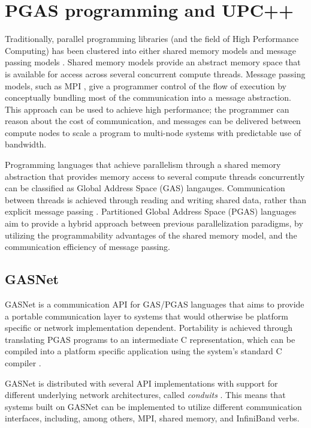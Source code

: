 \documentclass{uit-report}
\begin{document}
\chapter{PGAS programming and UPC++}
Traditionally, parallel programming libraries (and the field of High Performance Computing) has been clustered into either shared memory models and message passing models \cite{pgas_languages}. Shared memory models provide an abstract memory space that is available for access across several concurrent compute threads. Message passing models, such as MPI \cite{MPI}, give a programmer control of the flow of execution by conceptually bundling most of the communication into a message abstraction. This approach can be used to achieve high performance; the programmer can reason about the cost of communication, and messages can be delivered between compute nodes to scale a program to multi-node systems with predictable use of bandwidth.


Programming languages that achieve parallelism through a shared memory abstraction that provides memory access to several compute threads concurrently can be classified as Global Address Space (GAS) langauges. Communication between threads is achieved through reading and writing shared data, rather than explicit message passing \cite{gasnet_description}. Partitioned Global Address Space (PGAS) languages aim to provide a hybrid approach between previous parallelization paradigms, by utilizing the programmability advantages of the shared memory model, and the communication efficiency of message passing.

\section{GASNet}
GASNet is a communication API for GAS/PGAS languages that aims to provide a portable communication layer to systems that would otherwise be platform specific or network implementation dependent. Portability is achieved through translating PGAS programs to an intermediate C representation, which can be compiled into a platform specific application using the system's standard C compiler \cite{gasnet_description}.

GASNet is distributed with several API implementations with support for different underlying network architectures, called \emph{conduits} \cite{gasnetreadme}. This means that systems built on GASNet can be implemented to utilize different communication interfaces, including, among others, MPI, shared memory, and InfiniBand verbs.
\end{document}
